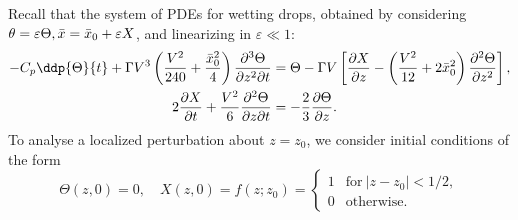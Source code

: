 Recall that the system of PDEs for wetting drops, obtained by considering $\theta = \varepsilon \Theta, \bar{x} = \bar{x}_0 +  \varepsilon X$, and linearizing in $ \varepsilon \ll 1$:
\begin{align}
- C_p\ddp{\Theta}{t}+ \Gamma V^3\left(\frac{V^2}{240} + \frac{\bar{x}_0^2}{4}\right) \frac{\partial^3 \Theta}{\partial z^2 \partial t} &= \Theta - \Gamma V \left[\frac{\partial X}{\partial z} - \left(\frac{V^2}{12} + 2  \bar{x}_0^2 \right)\frac{\partial^2 \Theta}{\partial z^2}\right],\label{E:ClusterSizes:LargeGamma:LinearisedPDEs1}\\
2\frac{\partial X}{\partial t} +\frac{V^2}{6} \frac{\partial^2 \Theta}{\partial z \partial t} &= -\frac{2}{3} \frac{\partial \Theta}{\partial z}.\label{E:ClusterSizes:LargeGammaLinearisedPDEs2}
\end{align}
To analyse a localized perturbation about $z = z_0$, we consider initial conditions of the form
\begin{equation}\label{E:ClusterSizes:LargeGamma:InitialCondition}
\Theta(z, 0) = 0, \quad X(z,0) = f(z; z_0) =
\begin{cases}
1& \text{for}~|z-z_0| < 1/2,\\
0 & \text{otherwise}.
\end{cases}
\end{equation}

